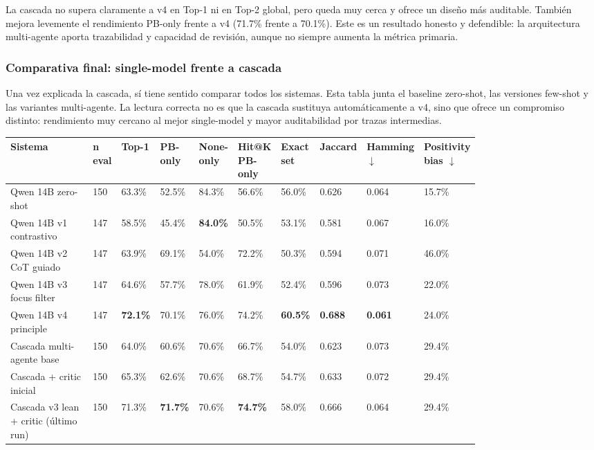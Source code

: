 La cascada no supera claramente a v4 en Top-1 ni en Top-2 global, pero queda muy cerca y ofrece un diseño más auditable. También mejora levemente el rendimiento PB-only frente a v4 (71.7\% frente a 70.1\%). Este es un resultado honesto y defendible: la arquitectura multi-agente aporta trazabilidad y capacidad de revisión, aunque no siempre aumenta la métrica primaria.


\subsubsection*{Comparativa final: single-model frente a cascada}

Una vez explicada la cascada, sí tiene sentido comparar todos los sistemas. Esta tabla junta el baseline zero-shot, las versiones few-shot y las variantes multi-agente. La lectura correcta no es que la cascada sustituya automáticamente a v4, sino que ofrece un compromiso distinto: rendimiento muy cercano al mejor single-model y mayor auditabilidad por trazas intermedias.

\begin{center}
\scriptsize
\setlength{\tabcolsep}{3pt}
\renewcommand{\arraystretch}{1.15}
\begin{tabular}{p{0.22\linewidth}p{0.05\linewidth}p{0.065\linewidth}p{0.065\linewidth}p{0.065\linewidth}p{0.065\linewidth}p{0.065\linewidth}p{0.065\linewidth}p{0.065\linewidth}p{0.065\linewidth}}
\toprule
Sistema & n eval & Top-1 & PB-only & None-only & Hit@K PB-only & Exact set & Jaccard & Hamming $\downarrow$ & Positivity bias $\downarrow$ \\
\midrule
Qwen 14B zero-shot & 150 & 63.3\% & 52.5\% & 84.3\% & 56.6\% & 56.0\% & 0.626 & 0.064 & 15.7\% \\
Qwen 14B v1 contrastivo & 147 & 58.5\% & 45.4\% & \textbf{84.0\%} & 50.5\% & 53.1\% & 0.581 & 0.067 & 16.0\% \\
Qwen 14B v2 CoT guiado & 147 & 63.9\% & 69.1\% & 54.0\% & 72.2\% & 50.3\% & 0.594 & 0.071 & 46.0\% \\
Qwen 14B v3 focus filter & 147 & 64.6\% & 57.7\% & 78.0\% & 61.9\% & 52.4\% & 0.596 & 0.073 & 22.0\% \\
Qwen 14B v4 principle & 147 & \textbf{72.1\%} & 70.1\% & 76.0\% & 74.2\% & \textbf{60.5\%} & \textbf{0.688} & \textbf{0.061} & 24.0\% \\
Cascada multi-agente base & 150 & 64.0\% & 60.6\% & 70.6\% & 66.7\% & 54.0\% & 0.623 & 0.073 & 29.4\% \\
Cascada + critic inicial & 150 & 65.3\% & 62.6\% & 70.6\% & 68.7\% & 54.7\% & 0.633 & 0.072 & 29.4\% \\
Cascada v3 lean + critic (último run) & 150 & 71.3\% & \textbf{71.7\%} & 70.6\% & \textbf{74.7\%} & 58.0\% & 0.666 & 0.064 & 29.4\% \\
\bottomrule
\end{tabular}
\end{center}

